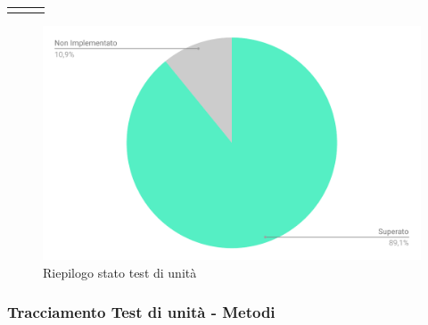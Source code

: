 \begin{tabularx}{\textwidth}{cXc}
	
	\rowcolor{white}
	\caption{Test di unità}
	\label{tab:tabellatestunità}
\end{tabularx}

\begin{figure}[H]
	\centering
	\includegraphics[width=0.7\linewidth]{sez/test/img/statoTestUnita.pdf}
	\caption{Riepilogo stato test di unità}
\end{figure}

\subsubsection{Tracciamento Test di unità - Metodi}

